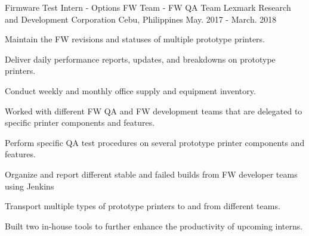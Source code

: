 

\begin{cventries}

  \cventry
    {Firmware Test Intern - Options FW Team - FW QA Team} %
    {Lexmark Research and Development Corporation } %
    {Cebu, Philippines} %
    {May. 2017 - March. 2018} %
    {
      \begin{cvitems} %
        \item {Maintain the FW revisions and statuses of multiple prototype printers.}
        \item {Deliver daily performance reports, updates, and breakdowns on prototype printers.}
        \item {Conduct weekly and monthly office supply and equipment inventory.}
        \item {Worked with different FW QA and FW development teams that are delegated to specific printer components and features.}
        \item {Perform specific QA test procedures on several prototype printer components and features.}
        \item {Organize and report different stable and failed builds from FW developer teams using Jenkins}
        \item {Transport multiple types of prototype printers to and from different teams.}
        \item {Built two in-house tools to further enhance the productivity of upcoming interns.}
      \end{cvitems}
    }

\end{cventries}
